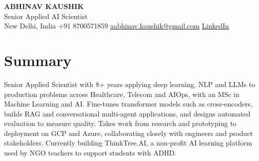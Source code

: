 \documentclass[10pt,a4paper]{article}
\begin{document}
\begin{center}
  {\LARGE\bfseries ABHINAV KAUSHIK}\\[2pt]
  {\large Senior Applied AI Scientist}\\[2pt]
  New Delhi, India \textbar{} +91 8700571859 \textbar{} \href{mailto:aabhinav.kaushik@gmail.com}{aabhinav.kaushik@gmail.com} \textbar{} \href{https://www.linkedin.com/in/abhinav-kaushik10/}{LinkedIn}  
\end{center}

\section{Summary}
Senior Applied Scientist with 8+ years applying deep learning, NLP and LLMs to production problems across Healthcare, Telecom and AIOps, with an MSc in Machine Learning and AI. Fine-tunes transformer models such as cross-encoders, builds RAG and conversational multi-agent applications, and designs automated evaluation to measure quality. Takes work from research and prototyping to deployment on GCP and Azure, collaborating closely with engineers and product stakeholders. Currently building ThinkTree.AI, a non-profit AI learning platform used by NGO teachers to support students with ADHD.
\end{document}

